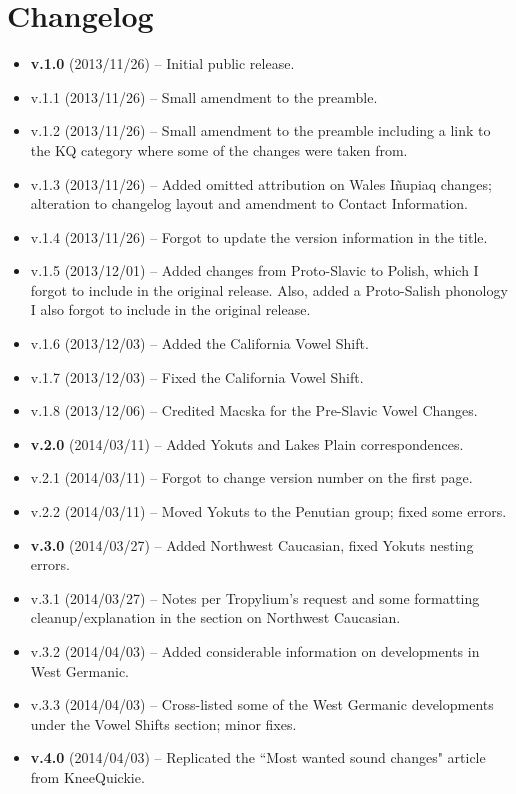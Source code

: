 \documentclass[11pt]{article}
\begin{document}
\section{Changelog}
\begin{itemize}
\item \textbf{v.1.0} (2013/11/26) -- Initial public release.
\item v.1.1 (2013/11/26) -- Small amendment to the preamble.
\item v.1.2 (2013/11/26) -- Small amendment to the preamble including a link to the KQ category where some of the changes were taken from.
\item v.1.3 (2013/11/26) -- Added omitted attribution on Wales I\~{n}upiaq changes; alteration to changelog layout and amendment to Contact Information.
\item v.1.4 (2013/11/26) -- Forgot to update the version information in the title.
\item v.1.5 (2013/12/01) -- Added changes from Proto-Slavic to Polish, which I forgot to include in the original release. Also, added a Proto-Salish phonology I also forgot to include in the original release.
\item v.1.6 (2013/12/03) -- Added the California Vowel Shift.
\item v.1.7 (2013/12/03) -- Fixed the California Vowel Shift.
\item v.1.8 (2013/12/06) -- Credited Macska for the Pre-Slavic Vowel Changes.
\item \textbf{v.2.0} (2014/03/11) -- Added Yokuts and Lakes Plain correspondences.
\item v.2.1 (2014/03/11) -- Forgot to change version number on the first page.
\item v.2.2 (2014/03/11) -- Moved Yokuts to the Penutian group; fixed some errors.
\item \textbf{v.3.0} (2014/03/27) -- Added Northwest Caucasian, fixed Yokuts nesting errors.
\item v.3.1 (2014/03/27) -- Notes per Tropylium's request and some formatting cleanup/explanation in the section on Northwest Caucasian.
\item v.3.2 (2014/04/03) -- Added considerable information on developments in West Germanic.
\item v.3.3 (2014/04/03) -- Cross-listed some of the West Germanic developments under the Vowel Shifts section; minor fixes.
\item \textbf{v.4.0} (2014/04/03) -- Replicated the ``Most wanted sound changes" article from KneeQuickie.

\end{itemize}
\end{document}
